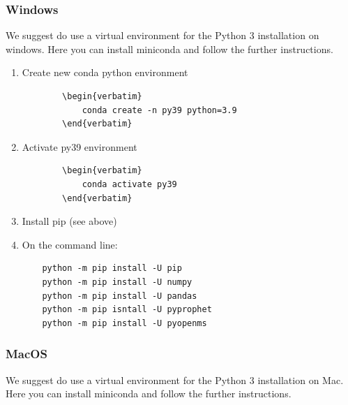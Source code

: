 \subsubsection{Windows}
We suggest do use a virtual environment for the Python 3 installation on windows. 
Here you can install miniconda and follow the further instructions. \\

\begin{enumerate}
  \item Create new conda python environment
    \begin{lstlisting}
    	\begin{verbatim}
   			conda create -n py39 python=3.9
   		\end{verbatim}	
    \end{lstlisting} 
  \item Activate py39 environment
    \begin{lstlisting}
    	\begin{verbatim}
    		conda activate py39    
    	\end{verbatim}
    \end{lstlisting} 
  \item Install pip (see above)
  \item On the command line:
    \begin{listing}
\begin{verbatim}
    python -m pip install -U pip
    python -m pip install -U numpy
    python -m pip install -U pandas
    python -m pip isntall -U pyprophet
    python -m pip install -U pyopenms
    \end{verbatim}
\end{listing}
\end{enumerate}

\subsubsection{MacOS}
We suggest do use a virtual environment for the Python 3 installation on Mac. 
Here you can install miniconda and follow the further instructions. \\

